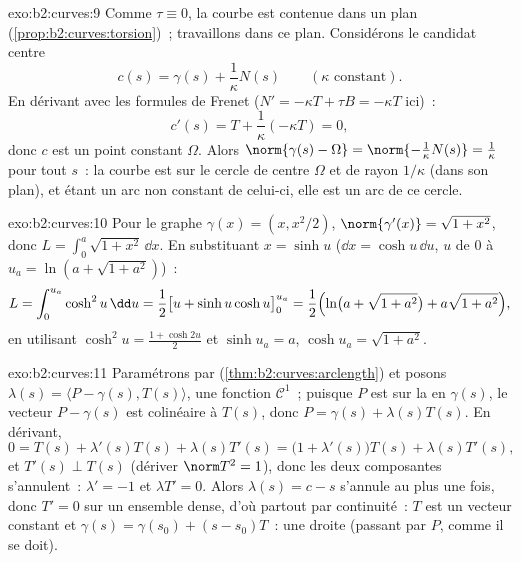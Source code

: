 \begin{solution}{exo:b2:curves:9}
Comme $\tau \equiv 0$, la courbe est contenue dans un plan
(\cref{prop:b2:curves:torsion})~; travaillons dans ce plan.
Considérons le
candidat centre
\[
c(s) = \gamma(s) + \frac{1}{\kappa}N(s)
\qquad (\kappa \text{ constant}).
\]
En dérivant avec les formules de Frenet ($N' = -\kappa T + \tau B
= -\kappa T$ ici)~:
\[
c'(s) = T + \frac1\kappa(-\kappa T) = 0 ,
\]
donc $c$ est un point constant $\Omega$. Alors $\norm{\gamma(s) -
\Omega} = \norm{-\frac1\kappa N(s)} = \frac1\kappa$ pour tout $s$~:
la courbe est sur le cercle de centre $\Omega$ et de rayon
$1/\kappa$ (dans son plan), et étant un arc non constant de
celui-ci, elle est un arc de ce cercle.
\end{solution}

\begin{solution}{exo:b2:curves:10}
Pour le graphe $\gamma(x) = (x, x^2/2)$, $\norm{\gamma'(x)} =
\sqrt{1 + x^2}$, donc $L = \int_0^a\sqrt{1+x^2}\,\dd x$.
En substituant $x = \sinh u$ ($\dd x = \cosh u\,\dd u$, $u$ de
$0$ à $u_a = \ln(a + \sqrt{1+a^2})$)~:
\[
L = \int_0^{u_a}\cosh^2 u\,\dd u
= \frac12\bigl[u + \sinh u\cosh u\bigr]_0^{u_a}
= \frac12\Bigl(\ln\bigl(a + \sqrt{1+a^2}\bigr) +
a\sqrt{1+a^2}\Bigr),
\]
en utilisant $\cosh^2 u = \frac{1 + \cosh 2u}2$ et $\sinh u_a = a$,
$\cosh u_a = \sqrt{1 + a^2}$.
\end{solution}

\begin{solution}{exo:b2:curves:11}
Paramétrons par 
(\cref{thm:b2:curves:arclength}) et posons $\lambda(s) =
\langle P - \gamma(s), T(s)\rangle$, une fonction $\mathcal C^1$~;
puisque $P$ est sur la  en $\gamma(s)$,
le vecteur $P - \gamma(s)$ est colinéaire à $T(s)$, donc $P =
\gamma(s) + \lambda(s)T(s)$. En dérivant,
\[
0 = T(s) + \lambda'(s)T(s) + \lambda(s)T'(s)
= \bigl(1 + \lambda'(s)\bigr)T(s) + \lambda(s)T'(s),
\]
et $T'(s) \perp T(s)$ (dériver $\norm T^2 = 1$), donc
les deux composantes s'annulent~: $\lambda' = -1$ et $\lambda T' = 0$.
Alors $\lambda(s) = c - s$ s'annule au plus une fois, donc $T' = 0$
sur un ensemble dense, d'où partout par continuité~: $T$ est un
vecteur  constant et $\gamma(s) = \gamma(s_0) + (s -
s_0)T$~: une droite (passant par $P$, comme il se doit).
\end{solution}

